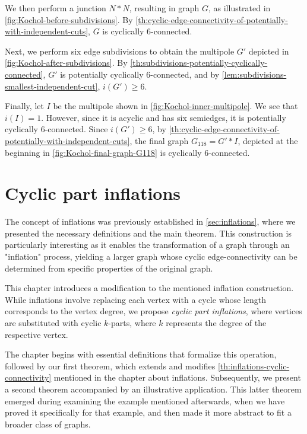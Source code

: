 \documentclass[12pt, twoside]{book}
\begin{document}
\begin{example}
	We then perform a junction $N*N$, resulting in graph $G$, as illustrated in \cref{fig:Kochol-before-subdivisions}. By \cref{th:cyclic-edge-connectivity-of-potentially-with-independent-cuts}, $G$ is cyclically 6-connected.
	
	Next, we perform six edge subdivisions to obtain the multipole $G'$ depicted in \cref{fig:Kochol-after-subdivisions}. By \cref{th:subdivisions-potentially-cyclically-connected}, $G'$ is potentially cyclically 6-connected, and by \cref{lem:subdivisions-smallest-independent-cut}, $i(G')\geq 6$.
	
	Finally, let $I$ be the multipole shown in \cref{fig:Kochol-inner-multipole}. We see that $i(I)=1$. However, since it is acyclic and has six semiedges, it is potentially cyclically 6-connected. Since $i(G')\geq 6$, by \cref{th:cyclic-edge-connectivity-of-potentially-with-independent-cuts}, the final graph $G_{118}=G'*I$, depicted at the beginning in \cref{fig:Kochol-final-graph-G118} is cyclically 6-connected.
\end{example}

\chapter{Cyclic part inflations}\label{ch:cyclic-part-inflations}

The concept of inflations was previously established in \cref{sec:inflations}, where we presented the necessary definitions and the main theorem. This construction is particularly interesting as it enables the transformation of a graph through an "inflation" process, yielding a larger graph whose cyclic edge-connectivity can be determined from specific properties of the original graph.

This chapter introduces a modification to the mentioned inflation construction. While inflations involve replacing each vertex with a cycle whose length corresponds to the vertex degree, we propose \textit{cyclic part inflations}, where vertices are substituted with cyclic $k$-parts, where $k$ represents the degree of the respective vertex.

The chapter begins with essential definitions that formalize this operation, followed by our first theorem, which extends and modifies \cref{th:inflations-cyclic-connectivity} mentioned in the chapter about inflations. Subsequently, we present a second theorem accompanied by an illustrative application. This latter theorem emerged during examining the example mentioned afterwards, when we have proved it specifically for that example, and then made it more abstract to fit a broader class of graphs.
\end{document}

